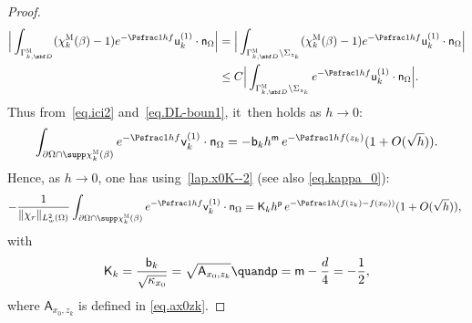 \begin{proof}
\[\begin{aligned}
\Big \vert\int_{ \Gamma_{k,\mbf D}^{ \textsc{M} }}
(\chi_k^{\textsc{M}} (\beta)-1) e^{-\Psfrac 1hf} \mathsf u_k^{(1)}
\cdot \mathsf n_\Omega\Big \vert &= \Big\vert\int_{ \Gamma_{k,\mbf
D}^{ \textsc{M} }\setminus \Sigma_{z_k}}
(\chi_k^{\textsc{M}} (\beta)-1) e^{-\Psfrac 1hf} \mathsf u_k^{(1)}
\cdot \mathsf n_\Omega\Big \vert\\
&\le C \Big \vert \int_{ \Gamma_{k,\mbf D}^{ \textsc{M} }\setminus \Sigma_{z_k}} e^{-\Psfrac 1hf} \mathsf u_k^{(1)} \cdot \mathsf n_\Omega\Big \vert.
\end{aligned}
\]
Thus from~\eqref{eq.ici2} and~\eqref{eq.DL-boun1}, it~then holds as $h\to 0$:
\[
\int_{\partial \Omega \cap\supp \chi_k^{\textsc{M}} (\beta) } e^{-\Psfrac 1hf} \mathsf v_k^{(1)} \cdot \mathsf n_\Omega =-\mathsf b_k h^{\mathsf m} \, e^{-\Psfrac 1h f(z_k)} (1+O(\sqrt h)).
\]
Hence, as $h\to 0$, one has using~\eqref{lap.x0K--2} (see also \eqref{eq.kappa_0}):\vspace*{-3pt}
\begin{align*}
-\frac{1}{\Vert \chi_r\Vert_{L^2_w(\Omega)}} \int_{\partial \Omega \cap\supp \chi_k^{\textsc{M}} (\beta) } e^{-\Psfrac 1hf} \mathsf v_k^{(1)} \cdot \mathsf n_\Omega = \mathsf K_kh^{\mathsf p}\, e^{-\Psfrac 1h(f(z_k)-f(x_0))} (1+O(\sqrt h)),\
\end{align*}
with\vspace*{-3pt}
\begin{align}\label{eq.constantK}
\mathsf K_k= \frac{\mathsf b_k}{\sqrt{\kappa_{x_0}}}=\sqrt{\mathsf A_{x_0,z_k}}\quand\mathsf p=\mathsf m-\frac d4= -\frac 12,
\end{align}
where $\mathsf A_{x_0,z_k}$ is defined in \eqref{eq.ax0zk}.


\end{proof}
